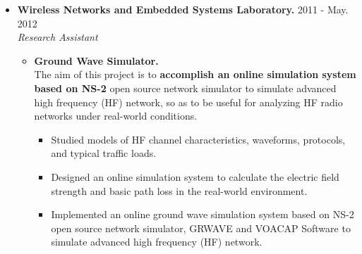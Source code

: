 \documentclass[letter]{article}
\newenvironment{experience}[4]{
\item \textbf{#1.} \hfill #3 - #4 \\
\emph{#2}
}{
}
\begin{document}
\begin{description}
\begin{itemize}
\begin{experience}
{Wireless Networks and Embedded Systems Laboratory}
{Research Assistant}
{2011}{May. 2012}
\begin{itemize}
\item \textbf{Ground Wave Simulator.}\\
The aim of this project is to \textbf{accomplish an online simulation system based on NS-2} open source network simulator to simulate advanced high frequency (HF) network, so as to be useful for analyzing HF radio networks under real-world conditions. 
\begin{itemize}
\item Studied models of HF channel characteristics, waveforms, protocols, and typical traffic loads.
\item Designed an online simulation system to calculate the electric field strength and basic path loss in the real-world environment.
\item Implemented an online ground wave simulation system based on NS-2 open source network simulator, GRWAVE and VOACAP Software to simulate advanced high frequency (HF) network.
\end{itemize}



\end{itemize}
\end{experience}
\end{itemize}
\end{description}
\end{document}
